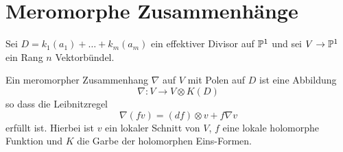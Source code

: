 \chapter{Meromorphe Zusammenhänge}
%
Sei $D=k_1(a_1)+\dots+k_m(a_m)$ ein effektiver Divisor auf $\P^1$ und sei
$V\to\P^1$ ein Rang $n$ Vektorbündel.
\begin{defn}
Ein meromorpher Zusammenhang $\nabla$ auf $V$ mit Polen auf $D$ ist eine
Abbildung
\[
  \nabla: V\to V\otimes K(D)
\]
so dass die Leibnitzregel
\begin{equation}
  \nabla(fv)=(df)\otimes v + f\nabla v
\end{equation}
erfüllt ist. Hierbei ist $v$ ein lokaler Schnitt von $V$, $f$ eine lokale
holomorphe Funktion und $K$ die Garbe der holomorphen Eins-Formen.
\end{defn}
%
\begin{comment}
\begin{prop}
Die Differenz zweier meromorphen Zusammenhänge ist $???$-linear.
\end{prop}
\begin{proof}
Denn für zwei meromorphe Zusammenhänge $\nabla_1$ und $\nabla_2$ gilt:
\begin{align*}
(\nabla_1 - \nabla_2)(fv) &= \nabla_1(fv) - \nabla_2(fv)
\\&=(df)\otimes v + f\nabla_1 v -(df)\otimes v - f\nabla_2 v
\\&=f\nabla_1 v - f\nabla_2 v
\\&=f(\nabla_1 - \nabla_2) v
\end{align*}
und da ??? gilt reicht dies um die Aussage zu zeigen
\end{proof}
\end{comment}
%
\begin{prop}[Proposition 2.1]
\end{prop}


